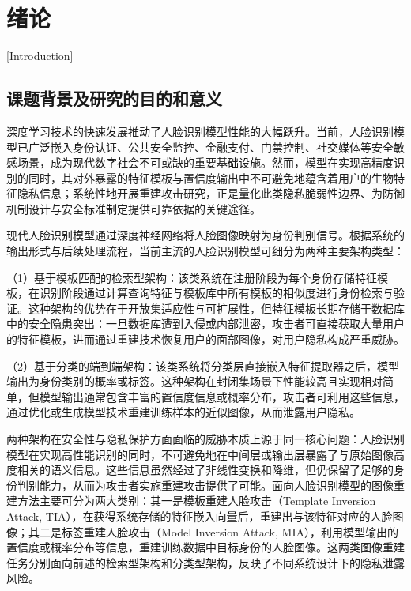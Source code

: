 
\chapter{绪论}[Introduction]\label{chap:introduction}
\section{课题背景及研究的目的和意义}\label{sec:background}

深度学习技术的快速发展推动了人脸识别模型性能的大幅跃升\cite{taigman2014deepface,schroff2015facenet,cao2018vggface2}。当前，人脸识别模型已广泛嵌入身份认证、公共安全监控、金融支付、门禁控制、社交媒体等安全敏感场景\cite{huang2008labeled,deng2019arcface,jegorova2022survey,MMXB202404003}，成为现代数字社会不可或缺的重要基础设施。然而，模型在实现高精度识别的同时，其对外暴露的特征模板与置信度输出中不可避免地蕴含着用户的生物特征隐私信息\cite{du2022elements,rigaki2023survey,JSJX202302012,TXBM201906011}；系统性地开展重建攻击研究，正是量化此类隐私脆弱性边界、为防御机制设计与安全标准制定提供可靠依据的关键途径\cite{sharif2016accessorize,komkov2021advhat,fang2024privacy,RJXB202007012}。

现代人脸识别模型通过深度神经网络将人脸图像映射为身份判别信号\cite{he2016deep,deng2019arcface}。根据系统的输出形式与后续处理流程，当前主流的人脸识别模型可细分为两种主要架构类型：

（1）基于模板匹配的检索型架构：该类系统在注册阶段为每个身份存储特征模板，在识别阶段通过计算查询特征与模板库中所有模板的相似度进行身份检索与验证。这种架构的优势在于开放集适应性与可扩展性，但特征模板长期存储于数据库中的安全隐患突出：一旦数据库遭到入侵或内部泄密，攻击者可直接获取大量用户的特征模板，进而通过重建技术恢复用户的面部图像，对用户隐私构成严重威胁\cite{mai2018reconstruction,cole2017synthesizing}。

（2）基于分类的端到端架构：该类系统将分类层直接嵌入特征提取器之后，模型输出为身份类别的概率或标签。这种架构在封闭集场景下性能较高且实现相对简单，但模型输出通常包含丰富的置信度信息或概率分布，攻击者可利用这些信息，通过优化或生成模型技术重建训练样本的近似图像，从而泄露用户隐私\cite{fredrikson2015model,zhang2020secret}。

两种架构在安全性与隐私保护方面面临的威胁本质上源于同一核心问题：人脸识别模型在实现高性能识别的同时，不可避免地在中间层或输出层暴露了与原始图像高度相关的语义信息\cite{fredrikson2015model,chen2021knowledge}。这些信息虽然经过了非线性变换和降维，但仍保留了足够的身份判别能力，从而为攻击者实施重建攻击提供了可能。面向人脸识别模型的图像重建方法主要可分为两大类别：其一是模板重建人脸攻击（Template Inversion Attack, TIA），在获得系统存储的特征嵌入向量后，重建出与该特征对应的人脸图像\cite{mai2018reconstruction,cole2017synthesizing}；其二是标签重建人脸攻击（Model Inversion Attack, MIA），利用模型输出的置信度或概率分布等信息，重建训练数据中目标身份的人脸图像\cite{fredrikson2015model,zhang2020secret}。这两类图像重建任务分别面向前述的检索型架构和分类型架构，反映了不同系统设计下的隐私泄露风险。

